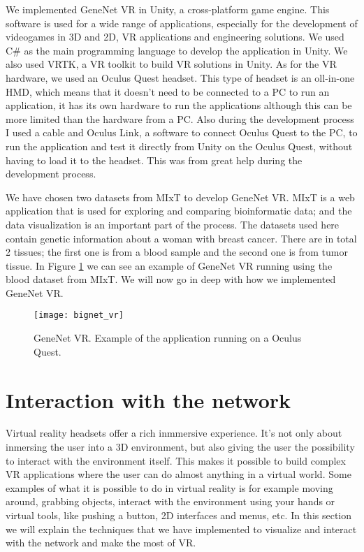 We implemented GeneNet VR in Unity, a cross-platform game engine. This software is used for a wide range of applications, especially for the development of videogames in 3D and 2D, VR applications and engineering solutions. We used C\# as the main programming language to develop the application in Unity. We also used VRTK, a VR toolkit to build VR solutions in Unity. As for the VR hardware, we used an Oculus Quest headset. This type of headset is an oll-in-one HMD, which means that it doesn't need to be connected to a PC to run an application, it has its own hardware to run the applications although this can be more limited than the hardware from a PC. Also during the development process I used a cable and Oculus Link, a software to connect Oculus Quest to the PC, to run the application and test it directly from Unity on the Oculus Quest, without having to load it to the headset. This was from great help during the development process.

We have chosen two datasets from MIxT to develop GeneNet VR. MIxT is a web application that is used for exploring and comparing bioinformatic data\cite{fjukstad_dumeaux_olsen_lund_hallett_bongo_2017}\cite{dumeaux_fjukstad_interactions_tumor_blood}; and the data visualization is an important part of the process. The datasets used here contain genetic information about a woman with breast cancer. There are in total 2 tissues; the first one is from a blood sample and the second one is from tumor tissue. In Figure \ref{fig:bignet_vr} we can see an example of GeneNet VR running using the blood dataset from MIxT. We will now go in deep with how we implemented GeneNet VR.

\begin{figure}[h!]
    \setlength{\tempheight}{15ex}
    \centering
    \texttt{[image: bignet\_vr]}
    \caption{GeneNet VR. Example of the application running on a Oculus Quest.}
    \label{fig:bignet_vr}
\end{figure}

\section{Interaction with the network}
Virtual reality headsets offer a rich inmmersive experience. It's not only about inmersing the user into a 3D environment, but also giving the user the possibility to interact with the environment itself. This makes it possible to build complex VR applications where the user can do almost anything in a virtual world. Some examples of what it is possible to do in virtual reality is for example moving around, grabbing objects, interact with the environment using your hands or virtual tools, like pushing a button, 2D interfaces and menus, etc. In this section we will explain the techniques that we have implemented to visualize and interact with the network and make the most of VR.

